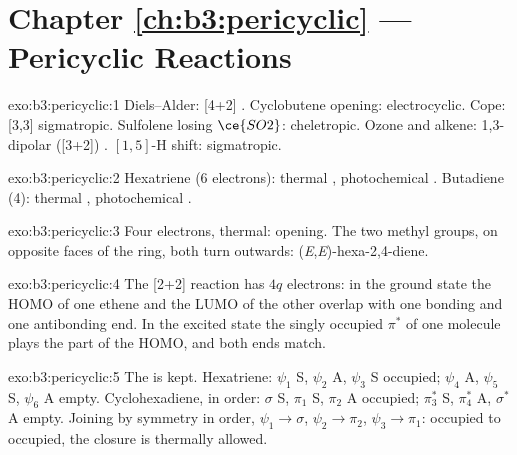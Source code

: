 \section*{Chapter \ref{ch:b3:pericyclic} --- Pericyclic Reactions}

\begin{solution}{exo:b3:pericyclic:1}
Diels--Alder: [4+2] . Cyclobutene opening: electrocyclic. Cope: [3,3]
sigmatropic. Sulfolene losing $\ce{SO2}$: cheletropic. Ozone and alkene: 1,3-dipolar
([3+2]) . $[1,5]$-H shift: sigmatropic.
\end{solution}

\begin{solution}{exo:b3:pericyclic:2}
Hexatriene (6 electrons): thermal , photochemical .
Butadiene (4): thermal , photochemical .
\end{solution}

\begin{solution}{exo:b3:pericyclic:3}
Four electrons, thermal:  opening. The two methyl groups, on opposite
faces of the ring, both turn outwards: (\textit{E},\textit{E})-hexa-2,4-diene.
\end{solution}

\begin{solution}{exo:b3:pericyclic:4}
The  [2+2] reaction has $4q$ electrons: in the ground state the HOMO of one
ethene and the LUMO of the other overlap with one bonding and one antibonding end.
In the excited state the singly occupied $\pi^*$ of one molecule plays the part of the
HOMO, and both ends match.
\end{solution}

\begin{solution}{exo:b3:pericyclic:5}
The  is kept. Hexatriene: $\psi_1$ S, $\psi_2$ A, $\psi_3$ S occupied; $\psi_4$ A, $\psi_5$ S, $\psi_6$ A empty.
Cyclohexadiene, in order: $\sigma$ S, $\pi_1$ S, $\pi_2$ A occupied; $\pi_3^*$ S, $\pi_4^*$ A, $\sigma^*$ A empty. Joining by
symmetry in order, $\psi_1 \to \sigma$, $\psi_2 \to \pi_2$, $\psi_3 \to \pi_1$: occupied to occupied, the  closure
is thermally allowed.
\end{solution}

